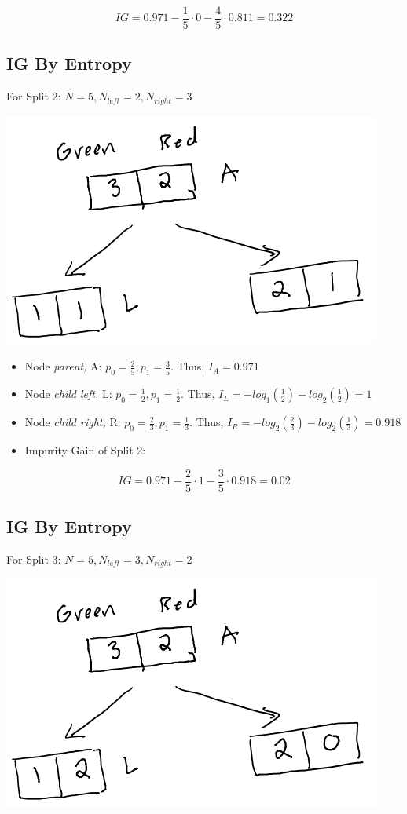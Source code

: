 \documentclass[
]{article}
\begin{document}
\[IG = 0.971 - \frac{1}{5} \cdot 0-\frac{4}{5} \cdot 0.811 = 0.322\]

\hypertarget{ig-by-entropy-1}{%
\subsection{IG By Entropy}\label{ig-by-entropy-1}}

For Split 2: \(N = 5, N_{left} =2, N_{right} = 3\)

\includegraphics{images/im3.png}

\begin{itemize}
\item
  Node \emph{parent,} A: \(p_0 = \frac{2}{5}, p_1 = \frac{3}{5}\). Thus,
  \(I_{A} = 0.971\)
\item
  Node \emph{child left,} L: \(p_0 = \frac{1}{2}, p_1 = \frac{1}{2}\).
  Thus, \(I_{L} = - log_1(\frac{1}{2})-log_2(\frac{1}{2})=1\)
\item
  Node \emph{child right,} R: \(p_0 = \frac{2}{3}, p_1 = \frac{1}{3}\).
  Thus, \(I_{R} = -log_2(\frac{2}{3}) -log_2(\frac{1}{3}) = 0.918\)
\item
  Impurity Gain of Split 2:
\end{itemize}

\[IG = 0.971 - \frac{2}{5} \cdot 1-\frac{3}{5} \cdot 0.918 = 0.02\]

\hypertarget{ig-by-entropy-2}{%
\subsection{IG By Entropy}\label{ig-by-entropy-2}}

For Split 3: \(N = 5, N_{left} =3, N_{right} = 2\)

\includegraphics{images/im2.png}
\end{document}
